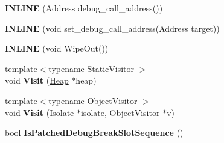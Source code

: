 \begin{DoxyCompactItemize}
\item 
{\bfseries I\+N\+L\+I\+NE} (Address debug\+\_\+call\+\_\+address())\hypertarget{classv8_1_1internal_1_1_reloc_info_a28601e180d7284e5900da38adbed71ce}{}\label{classv8_1_1internal_1_1_reloc_info_a28601e180d7284e5900da38adbed71ce}

\item 
{\bfseries I\+N\+L\+I\+NE} (void set\+\_\+debug\+\_\+call\+\_\+address(Address target))\hypertarget{classv8_1_1internal_1_1_reloc_info_affb50372e0c7c3e9441d26c1193b9eb4}{}\label{classv8_1_1internal_1_1_reloc_info_affb50372e0c7c3e9441d26c1193b9eb4}

\item 
{\bfseries I\+N\+L\+I\+NE} (void Wipe\+Out())\hypertarget{classv8_1_1internal_1_1_reloc_info_a97878ee9adeea7ce30430e88a79ad4d5}{}\label{classv8_1_1internal_1_1_reloc_info_a97878ee9adeea7ce30430e88a79ad4d5}

\item 
{\footnotesize template$<$typename Static\+Visitor $>$ }\\void {\bfseries Visit} (\hyperlink{classv8_1_1internal_1_1_heap}{Heap} $\ast$heap)\hypertarget{classv8_1_1internal_1_1_reloc_info_aeefc9e771d7e1a2394b4c16a5bb66b89}{}\label{classv8_1_1internal_1_1_reloc_info_aeefc9e771d7e1a2394b4c16a5bb66b89}

\item 
{\footnotesize template$<$typename Object\+Visitor $>$ }\\void {\bfseries Visit} (\hyperlink{classv8_1_1internal_1_1_isolate}{Isolate} $\ast$isolate, Object\+Visitor $\ast$v)\hypertarget{classv8_1_1internal_1_1_reloc_info_a89df526fcf49d45b6e171348744d303d}{}\label{classv8_1_1internal_1_1_reloc_info_a89df526fcf49d45b6e171348744d303d}

\item 
bool {\bfseries Is\+Patched\+Debug\+Break\+Slot\+Sequence} ()\hypertarget{classv8_1_1internal_1_1_reloc_info_ab2ececd48274c5b4175bf8b23fd1c2e7}{}\label{classv8_1_1internal_1_1_reloc_info_ab2ececd48274c5b4175bf8b23fd1c2e7}

\end{DoxyCompactItemize}
